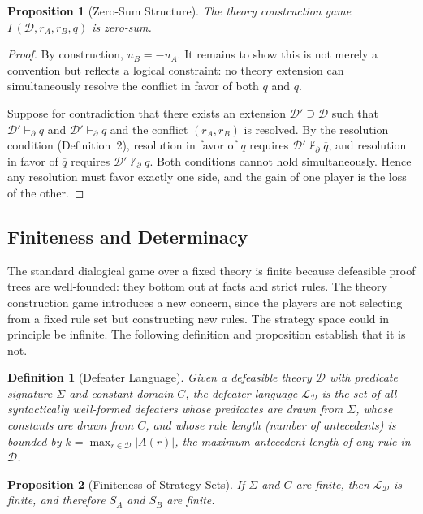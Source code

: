 \documentclass[11pt]{article}
\newtheorem{definition}{Definition}
\newtheorem{proposition}{Proposition}
\newcommand{\D}{\mathcal{D}}
\newcommand{\comp}[1]{\overline{#1}}
\begin{document}
\begin{proposition}[Zero-Sum Structure]\label{prop:zerosum}
The theory construction game $\Gamma(\D, r_A, r_B, q)$ is zero-sum.
\end{proposition}
 
\begin{proof}
By construction, $u_B = -u_A$. It remains to show this is not merely a convention but reflects a logical constraint: no theory extension can simultaneously resolve the conflict in favor of both $q$ and $\comp{q}$.
 
Suppose for contradiction that there exists an extension $\D' \supseteq \D$ such that $\D' \vdash_\partial q$ and $\D' \vdash_\partial \comp{q}$ and the conflict $(r_A, r_B)$ is resolved. By the resolution condition (Definition~2), resolution in favor of $q$ requires $\D' \not\vdash_\partial \comp{q}$, and resolution in favor of $\comp{q}$ requires $\D' \not\vdash_\partial q$. Both conditions cannot hold simultaneously. Hence any resolution must favor exactly one side, and the gain of one player is the loss of the other.
\end{proof}
 
\subsection{Finiteness and Determinacy}
 
The standard dialogical game over a fixed theory is finite because defeasible proof trees are well-founded: they bottom out at facts and strict rules. The theory construction game introduces a new concern, since the players are not selecting from a fixed rule set but constructing new rules. The strategy space could in principle be infinite. The following definition and proposition establish that it is not.
 
\begin{definition}[Defeater Language]\label{def:defeater_lang}
Given a defeasible theory $\D$ with predicate signature $\Sigma$ and constant domain $C$, the defeater language $\mathcal{L}_\D$ is the set of all syntactically well-formed defeaters whose predicates are drawn from $\Sigma$, whose constants are drawn from $C$, and whose rule length (number of antecedents) is bounded by $k = \max_{r \in \D} |A(r)|$, the maximum antecedent length of any rule in $\D$.
\end{definition}
 
\begin{proposition}[Finiteness of Strategy Sets]\label{prop:finiteness}
If $\Sigma$ and $C$ are finite, then $\mathcal{L}_\D$ is finite, and therefore $S_A$ and $S_B$ are finite.
\end{proposition}
 
\end{document}
